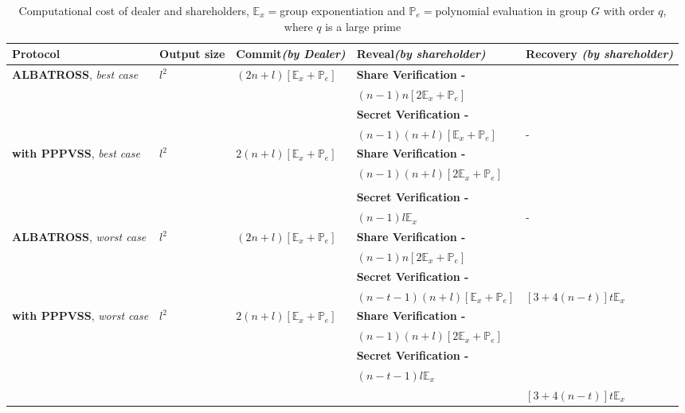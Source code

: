 \begin{table}[H]
\centering
\begin{tabular}{|p{3cm}|p{1.2cm}|p{2.5cm}|p{5.5cm}|p{2.5cm}|}
\hline
\textbf{Protocol}    & \textbf{Output size}    & 
\textbf{Commit}\textit{(by Dealer)} & \textbf{Reveal}\textit{(by 
shareholder)} & \textbf{Recovery} \textit{(by shareholder)}                                                           
\\ \hline
\textbf{ALBATROSS}, \textit{best case}    & $l^2$ & 
$(2n+l)[\mathbb{E}_x+\mathbb{P}_e]$ & \textbf{Share Verification - }  &  
\\
& & & $(n-1)n[2\mathbb{E}_x+\mathbb{P}_e]$ & \\
& & & \textbf{Secret Verification - } & \\ 
& & & $(n-1)(n+l)[\mathbb{E}_x+\mathbb{P}_e]$&- \\ \hline
\textbf{with PPPVSS}, \textit{best case}    & $l^2$  & 
$2(n+l)[\mathbb{E}_x+\mathbb{P}_e]$ & \textbf{Share Verification - } &  \\ 
& & & $(n-1)(n+l)[2\mathbb{E}_x+\mathbb{P}_e]$ &  \\ 
& & & &  \\
& & & \textbf{Secret Verification - } & \\ 
& & & $(n-1)l\mathbb{E}_x$ & -  \\ \hline
\textbf{ALBATROSS}, \textit{worst case}    & $l^2$ & 
$(2n+l)[\mathbb{E}_x+\mathbb{P}_e]$ & \textbf{Share Verification - }  &  
\\
& & & $(n-1)n[2\mathbb{E}_x+\mathbb{P}_e]$ & \\
& & & \textbf{Secret Verification - } & \\ 
& & & $(n-t-1)(n+l)[\mathbb{E}_x+\mathbb{P}_e]$& 
$[3+4(n-t)]t\mathbb{E}_{x}$\\ \hline
\textbf{with PPPVSS}, \textit{worst case}    & $l^2$  & 
$2(n+l)[\mathbb{E}_x+\mathbb{P}_e]$ & \textbf{Share Verification - } &  \\ 
& & & $(n-1)(n+l)[2\mathbb{E}_x+\mathbb{P}_e]$ &  \\
& & & \textbf{Secret Verification - } & \\ 
& & & $(n-t-1)l\mathbb{E}_x$ &   \\
& & & & $[3+4(n-t)]t\mathbb{E}_{x}$  \\ \hline

\end{tabular}
\caption{Computational cost of dealer and shareholders, 
$\mathbb{E}_x=$group exponentiation and $\mathbb{P}_e=$polynomial 
evaluation in group $G$ with order $q$, where $q$ is a large prime}
\label{tab:comp_alba_pppvss_no group mul}
\end{table}

